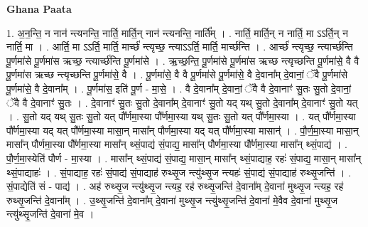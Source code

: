 \documentclass[17pt]{extarticle}
\begin{document}
\textbf{Ghana Paata } \newline

1. अ॒न॒न्ति॒ न नान॑ न्त्यनन्ति॒ नार्ति॒ मार्ति॒न् नान॑ न्त्यनन्ति॒ नार्ति᳚म् । . नार्ति॒ मार्ति॒न् न नार्ति॒ मा ऽऽर्ति॒न् न नार्ति॒ मा । . आर्ति॒ मा ऽऽर्ति॒ मार्ति॒ मार्च्छ॑ न्त्यृच्छ॒ न्त्याऽऽर्ति॒ मार्ति॒ मार्च्छ॑न्ति । . आर्च्छ॑ न्त्यृच्छ॒ न्त्यार्च्छ॑न्ति पू॒र्णमा॑से पू॒र्णमा॑स ऋच्छ॒ न्त्यार्च्छ॑न्ति पू॒र्णमा॑से । . ऋ॒च्छ॒न्ति॒ पू॒र्णमा॑से पू॒र्णमा॑स ऋच्छ न्त्यृच्छन्ति पू॒र्णमा॑से॒ वै वै पू॒र्णमा॑स ऋच्छ न्त्यृच्छन्ति पू॒र्णमा॑से॒ वै । . पू॒र्णमा॑से॒ वै वै पू॒र्णमा॑से पू॒र्णमा॑से॒ वै दे॒वाना᳚म् दे॒वानां॒ ॅवै पू॒र्णमा॑से पू॒र्णमा॑से॒ वै दे॒वाना᳚म् । . पू॒र्णमा॑स॒ इति॑ पू॒र्ण - मा॒से॒ । . वै दे॒वाना᳚म् दे॒वानां॒ ॅवै वै दे॒वानाꣳ॑ सु॒तः सु॒तो दे॒वानां॒ ॅवै वै दे॒वानाꣳ॑ सु॒तः । . दे॒वानाꣳ॑ सु॒तः सु॒तो दे॒वाना᳚म् दे॒वानाꣳ॑ सु॒तो यद् यथ् सु॒तो दे॒वाना᳚म् दे॒वानाꣳ॑ सु॒तो यत् । . सु॒तो यद् यथ् सु॒तः सु॒तो यत् पौ᳚र्णमा॒स्या पौ᳚र्णमा॒स्या यथ् सु॒तः सु॒तो यत् पौ᳚र्णमा॒स्या । . यत् पौ᳚र्णमा॒स्या पौ᳚र्णमा॒स्या यद् यत् पौ᳚र्णमा॒स्या मासा॒न् मासा᳚न् पौर्णमा॒स्या यद् यत् पौ᳚र्णमा॒स्या मासान्॑ । . पौ॒र्ण॒मा॒स्या मासा॒न् मासा᳚न् पौर्णमा॒स्या पौ᳚र्णमा॒स्या मासा᳚न् थ्सं॒पाद्य॑ सं॒पाद्य॒ मासा᳚न् पौर्णमा॒स्या पौ᳚र्णमा॒स्या मासा᳚न् थ्सं॒पाद्य॑ । . पौ॒र्ण॒मा॒स्येति॑ पौर्ण - मा॒स्या । . मासा᳚न् थ्सं॒पाद्य॑ सं॒पाद्य॒ मासा॒न् मासा᳚न् थ्सं॒पाद्याह॒ रहः॑ सं॒पाद्य॒ मासा॒न् मासा᳚न् थ्सं॒पाद्याहः॑ । . सं॒पाद्याह॒ रहः॑ सं॒पाद्य॑ सं॒पाद्याह॑ रुथ्सृ॒ज न्त्यु॑थ्सृ॒ज न्त्यहः॑ सं॒पाद्य॑ सं॒पाद्याह॑ रुथ्सृ॒जन्ति॑ । . सं॒पाद्येति॑ सं - पाद्य॑ । . अह॑ रुथ्सृ॒ज न्त्यु॑थ्सृ॒ज न्त्यह॒ रह॑ रुथ्सृ॒जन्ति॑ दे॒वाना᳚म् दे॒वाना॑ मुथ्सृ॒ज न्त्यह॒ रह॑ रुथ्सृ॒जन्ति॑ दे॒वाना᳚म् । . उ॒थ्सृ॒जन्ति॑ दे॒वाना᳚म् दे॒वाना॑ मुथ्सृ॒ज न्त्यु॑थ्सृ॒जन्ति॑ दे॒वाना॑ मे॒वैव दे॒वाना॑ मुथ्सृ॒ज न्त्यु॑थ्सृ॒जन्ति॑ दे॒वाना॑ मे॒व । \newline
\end{document}
